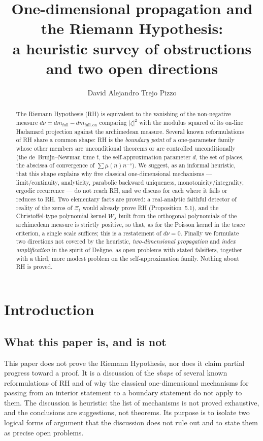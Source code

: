 \documentclass[11pt]{amsart}
\title[One-dimensional propagation and RH]{One-dimensional propagation and the Riemann
Hypothesis:\\ a heuristic survey of obstructions and two open directions}
\author{David Alejandro Trejo Pizzo}
\theoremstyle{definition}
\theoremstyle{remark}
\newcommand{\dmfull}{dm_{\mathrm{full}}}
\newcommand{\dmon}{dm_{\mathrm{full,on}}}
\newcommand{\Wl}{W_\lambda}
\begin{document}
\begin{abstract}
The Riemann Hypothesis (RH) is equivalent to the vanishing of the non-negative measure
$d\nu=\dmfull-\dmon$ comparing $|\zeta|^2$ with the modulus squared of its on-line Hadamard
projection against the archimedean measure. Several known reformulations of RH share a common
shape: RH is the \emph{boundary point} of a one-parameter family whose other members are
unconditional theorems or are controlled unconditionally (the de~Bruijn--Newman time $t$, the
self-approximation parameter $d$, the set of places, the abscissa of convergence of
$\sum\mu(n)n^{-s}$). We suggest, as an informal heuristic, that this shape explains why five
classical one-dimensional mechanisms --- limit/continuity, analyticity, parabolic backward
uniqueness, monotonicity/integrality, ergodic recurrence --- do not reach RH, and we discuss for
each where it fails or reduces to RH. Two elementary facts are proved: a real-analytic faithful
detector of reality of the zeros of $\Xi_t$ would already prove RH (Proposition~5.1), and the
Christoffel-type polynomial kernel $\Wl$ built from the orthogonal polynomials of the
archimedean measure is strictly positive, so that, as for the Poisson kernel in the trace
criterion, a single scale suffices; this is a restatement of $d\nu=0$. Finally we formulate two directions not covered by the heuristic,
\emph{two-dimensional propagation} and \emph{index amplification} in the spirit of Deligne, as
open problems with stated falsifiers, together with a third, more modest problem on the
self-approximation family. Nothing about RH is proved.
\end{abstract}

\maketitle
\tableofcontents
\newpage

\section{Introduction}

\subsection{What this paper is, and is not}
This paper does not prove the Riemann Hypothesis, nor does it claim partial progress toward a
proof. It is a discussion of the \emph{shape} of several known reformulations of RH and of why
the classical one-dimensional mechanisms for passing from an interior statement to a boundary
statement do not apply to them. The discussion is heuristic: the list of mechanisms is not
proved exhaustive, and the conclusions are suggestions, not theorems. Its purpose is to isolate
two logical forms of argument that the discussion does not rule out and to state them as precise
open problems.
\end{document}
